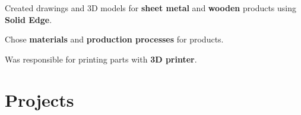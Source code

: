 \documentclass[letterpaper]{deedy-resume} %
\begin{document}
\begin{minipage}[t]{0.66\textwidth}
\sectionspace %



\begin{tightitemize}
  \item Created drawings and 3D models for \textbf{sheet metal} and \textbf{wooden} products using \textbf{Solid Edge}.
  \item Chose \textbf{materials} and \textbf{production processes} for products.
  \item Was responsible for printing parts with \textbf{3D printer}.
\end{tightitemize}

\sectionspace %



\section{Projects}

%
%




\end{minipage}
\end{document}
